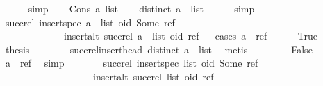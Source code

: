 \begin{isabellebody}
\ \ \ \ \isamarkupfalse%
\ simp\isanewline
{}\isamarkupfalse%
\isanewline
\ \ \isamarkupfalse%
\ {\isacharparenleft}Cons\ a\ list{\isacharparenright}\isanewline
\ \ \isamarkupfalse%
\ {\isachardoublequoteopen}distinct\ {\isacharparenleft}a\ {\isacharhash}\ list{\isacharparenright}{\isachardoublequoteclose}\isanewline
\ \ \ \ \isamarkupfalse%
\ simp\isanewline
\ \ \isamarkupfalse%
\ \isamarkupfalse%
\ {\isachardoublequoteopen}succ{\isacharunderscore}rel\ {\isacharparenleft}insert{\isacharunderscore}spec\ {\isacharparenleft}a\ {\isacharhash}\ list{\isacharparenright}\ {\isacharparenleft}oid{\isacharcomma}\ Some\ ref{\isacharparenright}{\isacharparenright}\ {\isacharequal}\isanewline
\ \ \ \ \ \ \ \ \ \ \ \ \ insert{\isacharunderscore}alt\ {\isacharparenleft}succ{\isacharunderscore}rel\ {\isacharparenleft}a\ {\isacharhash}\ list{\isacharparenright}{\isacharparenright}\ {\isacharparenleft}oid{\isacharcomma}\ ref{\isacharparenright}{\isachardoublequoteclose}\isanewline
\ \ \isamarkupfalse%
{\isacharparenleft}cases\ {\isachardoublequoteopen}a\ {\isacharequal}\ ref{\isachardoublequoteclose}{\isacharparenright}\isanewline
\ \ \ \ \isamarkupfalse%
\ True\isanewline
\ \ \ \ \isamarkupfalse%
\ \isamarkupfalse%
\ {\isacharquery}thesis\isanewline
\ \ \ \ \ \ \isamarkupfalse%
\ succ{\isacharunderscore}rel{\isacharunderscore}insert{\isacharunderscore}head\ {\isacartoucheopen}distinct\ {\isacharparenleft}a\ {\isacharhash}\ list{\isacharparenright}{\isacartoucheclose}\ \isamarkupfalse%
\ metis\isanewline
\ \ \isamarkupfalse%
\isanewline
\ \ \ \ \isamarkupfalse%
\ False\isanewline
\ \ \ \ \isamarkupfalse%
\ {\isachardoublequoteopen}a\ {\isasymnoteq}\ ref{\isachardoublequoteclose}\ \isamarkupfalse%
\ simp\isanewline
\ \ \ \ \isamarkupfalse%
\ \isamarkupfalse%
\ {\isachardoublequoteopen}succ{\isacharunderscore}rel\ {\isacharparenleft}insert{\isacharunderscore}spec\ list\ {\isacharparenleft}oid{\isacharcomma}\ Some\ ref{\isacharparenright}{\isacharparenright}\ {\isacharequal}\isanewline
\ \ \ \ \ \ \ \ \ \ \ \ \ \ \ \ \ \ \ insert{\isacharunderscore}alt\ {\isacharparenleft}succ{\isacharunderscore}rel\ list{\isacharparenright}\ {\isacharparenleft}oid{\isacharcomma}\ ref{\isacharparenright}{\isachardoublequoteclose}\isanewline
\ \ \ \ \ \ \isamarkupfalse%

\end{isabellebody}
